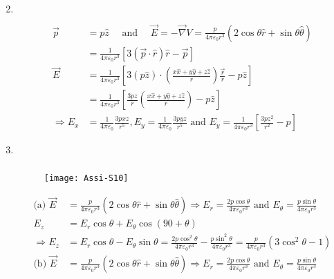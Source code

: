 \begin{enumerate}
\begin{answer}
\begin{align*}
	\end{align*}
\end{answer}
\item $\left. \right. $
\begin{answer}
	\begin{align*}
	\vec{p}&=p \hat{z} \quad\text{ and }\quad \vec{E}=-\vec{\nabla} V=\frac{p}{4 \pi \varepsilon_{0} r^{3}}(2 \cos \theta \hat{r}+\sin \theta \hat{\theta})\\&=\frac{1}{4 \pi \varepsilon_{0} r^{3}}[3(\vec{p} \cdot \hat{r}) \hat{r}-\vec{p}]\\
	\vec{E}&=\frac{1}{4 \pi \varepsilon_{0} r^{3}}\left[3(p \hat{z}) \cdot\left(\frac{x \hat{x}+y \hat{y}+z \hat{z}}{r}\right) \frac{\vec{r}}{r}-p \hat{z}\right]\\&=\frac{1}{4 \pi \varepsilon_{0} r^{3}}\left[\frac{3 p z}{r}\left(\frac{x \hat{x}+y \hat{y}+z \hat{z}}{r}\right)-p \hat{z}\right] \\
	\Rightarrow E_{x}&=\frac{1}{4 \pi \varepsilon_{0}} \frac{3 p x z}{r^{5}}, E_{y}=\frac{1}{4 \pi \varepsilon_{0}} \frac{3 p y z}{r^{5}} \text { and } E_{y}=\frac{1}{4 \pi \varepsilon_{0} r^{3}}\left[\frac{3 p z^{2}}{r^{2}}-p\right]
	\end{align*}
\end{answer}
\item $\left. \right. $
\begin{answer}$\left. \right. $
	\begin{figure}[H]
		\centering
		\texttt{[image: Assi-S10]}
	\end{figure}
	\begin{align*}
	 \text{(a) }\vec{E}&=\frac{p}{4 \pi \varepsilon_{0} r^{3}}(2 \cos \theta \hat{r}+\sin \theta \hat{\theta}) \Rightarrow E_{r}=\frac{2 p \cos \theta}{4 \pi \varepsilon_{0} r^{3}}\text{ and }E_{\theta}=\frac{p \sin \theta}{4 \pi \varepsilon_{0} r^{3}}\\
	E_{z}&=E_{r} \cos \theta+E_{\theta} \cos (90+\theta) \\
	\Rightarrow E_{z}&=E_{r} \cos \theta-E_{\theta} \sin \theta=\frac{2 p \cos ^{2} \theta}{4 \pi \varepsilon_{0} r^{3}}-\frac{p \sin ^{2} \theta}{4 \pi \varepsilon_{0} r^{3}}=\frac{p}{4 \pi \varepsilon_{0} r^{3}}\left(3 \cos ^{2} \theta-1\right)\\
	\text{(b) }\vec{E}&=\frac{p}{4 \pi \varepsilon_{0} r^{3}}(2 \cos \theta \hat{r}+\sin \theta \hat{\theta}) \Rightarrow E_{r}=\frac{2 p \cos \theta}{4 \pi \varepsilon_{0} r^{3}}\text{ and }E_{\theta}=\frac{p \sin \theta}{4 \pi \varepsilon_{0} r^{3}}\\

\end{align*}
\end{answer}
\end{enumerate}

